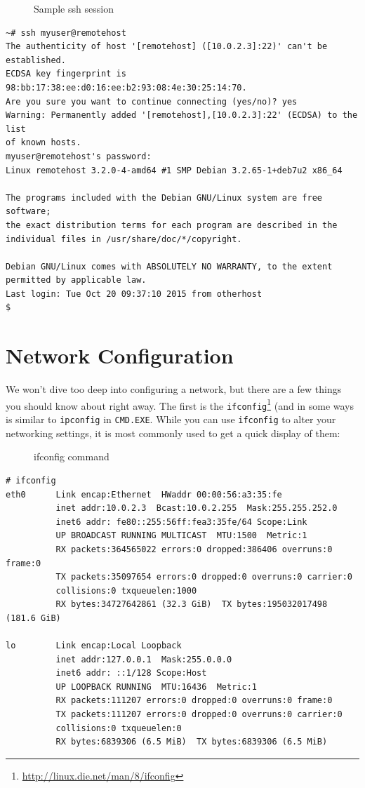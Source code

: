 \documentclass[10pt,]{book}
\renewcommand{\href}[2]{#2\footnote{\url{#1}}}
\numberwithin{figure}{chapter}
\DeclareRobustCommand{\drcap}[1]{\begin{figure}[H]\caption{#1}\end{figure}}
\DeclareRobustCommand{\drcmd}[1]{\index{Commands!#1}}
\DeclareRobustCommand{\drshl}[1]{\index{Shells!#1}}
\begin{document}
\drcap{Sample ssh session}

\begin{verbatim}
~# ssh myuser@remotehost
The authenticity of host '[remotehost] ([10.0.2.3]:22)' can't be established.
ECDSA key fingerprint is 98:bb:17:38:ee:d0:16:ee:b2:93:08:4e:30:25:14:70.
Are you sure you want to continue connecting (yes/no)? yes
Warning: Permanently added '[remotehost],[10.0.2.3]:22' (ECDSA) to the list
of known hosts.
myuser@remotehost's password:
Linux remotehost 3.2.0-4-amd64 #1 SMP Debian 3.2.65-1+deb7u2 x86_64

The programs included with the Debian GNU/Linux system are free software;
the exact distribution terms for each program are described in the
individual files in /usr/share/doc/*/copyright.

Debian GNU/Linux comes with ABSOLUTELY NO WARRANTY, to the extent
permitted by applicable law.
Last login: Tue Oct 20 09:37:10 2015 from otherhost
$
\end{verbatim}

\section*{Network Configuration}\label{network-configuration}

We won't dive too deep into configuring a network, but there are a few
things you should know about right away. The first is the
\href{http://linux.die.net/man/8/ifconfig}{\texttt{ifconfig}}\drcmd{ifconfig}
(and in some ways is similar to \texttt{ipconfig} in
\texttt{CMD.EXE}\drshl{CMD.EXE}. While you can use \texttt{ifconfig} to
alter your networking settings, it is most commonly used to get a quick
display of them:

\drcap{ifconfig command}

\begin{verbatim}
# ifconfig
eth0      Link encap:Ethernet  HWaddr 00:00:56:a3:35:fe
          inet addr:10.0.2.3  Bcast:10.0.2.255  Mask:255.255.252.0
          inet6 addr: fe80::255:56ff:fea3:35fe/64 Scope:Link
          UP BROADCAST RUNNING MULTICAST  MTU:1500  Metric:1
          RX packets:364565022 errors:0 dropped:386406 overruns:0 frame:0
          TX packets:35097654 errors:0 dropped:0 overruns:0 carrier:0
          collisions:0 txqueuelen:1000
          RX bytes:34727642861 (32.3 GiB)  TX bytes:195032017498 (181.6 GiB)

lo        Link encap:Local Loopback
          inet addr:127.0.0.1  Mask:255.0.0.0
          inet6 addr: ::1/128 Scope:Host
          UP LOOPBACK RUNNING  MTU:16436  Metric:1
          RX packets:111207 errors:0 dropped:0 overruns:0 frame:0
          TX packets:111207 errors:0 dropped:0 overruns:0 carrier:0
          collisions:0 txqueuelen:0
          RX bytes:6839306 (6.5 MiB)  TX bytes:6839306 (6.5 MiB)
\end{verbatim}
\end{document}
